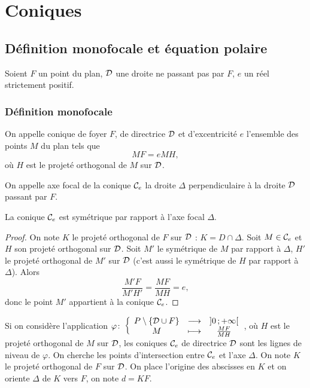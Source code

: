 \chapter{Coniques}
\minitoc
\minilof
\minilot
\section{Définition monofocale et équation polaire}
Soient $F$ un point du plan, $\mathcal{D}$ une droite ne passant pas par $F$, $e$ un réel strictement positif.
\subsection{Définition monofocale}
\begin{defdef}
   On appelle conique de foyer $F$, de directrice $\mathcal{D}$ et d'excentricité $e$ l'ensemble des points $M$ du plan tels que
  \begin{equation}
    MF=e MH,
  \end{equation}
  où $H$ est le projeté orthogonal de $M$ sur $\mathcal{D}$.
\end{defdef}
\begin{defdef}
  On appelle axe focal de la conique $\mathcal{C}_{e}$ la droite $\Delta$ perpendiculaire à la droite $\mathcal{D}$ passant par $F$.
\end{defdef}
\begin{prop}
  La conique $\mathcal{C}_{e}$ est symétrique par rapport à l'axe focal $\Delta$.
\end{prop}
\begin{proof}
  On note $K$ le projeté orthogonal de $F$ sur $\mathcal{D}$ : $K=D \cap \Delta$. Soit $M \in \mathcal{C}_{e}$ et $H$ son projeté orthogonal sur $\mathcal{D}$. Soit $M'$ le symétrique de $M$ par rapport à $\Delta$, $H'$ le projeté orthogonal de $M'$ sur $\mathcal{D}$ (c'est aussi le symétrique de $H$ par rapport à $\Delta$). Alors
\begin{equation}
  \frac{M'F}{M'H'} = \frac{MF}{MH} = e,
\end{equation}
donc le point $M'$ appartient à la conique $\mathcal{C}_{e}$.
\end{proof}
Si on considère l'application $\varphi\colon \left\{\begin{array}{ccc} P\setminus\{\mathcal{D} \cup F\} & \longrightarrow &\left] 0 \, ;  +\infty \right[\\ M & \longmapsto & \frac{MF}{MH} \end{array} \right.$, où $H$ est le projeté orthogonal de $M$ sur $\mathcal{D}$, les coniques $\mathcal{C}_{e}$ de directrice $\mathcal{D}$ sont les lignes de niveau de $\varphi$. On cherche les points d'intersection entre $\mathcal{C}_{e}$ et l'axe $\Delta$. On note $K$ le projeté orthogonal de $F$ sur $\mathcal{D}$. On place l'origine des abscisses en $K$ et on oriente $\Delta$ de $K$ vers $F$, on note $d=KF$. 


